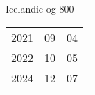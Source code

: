 \documentclass[10pt,a4paper]{article}
\begin{document}
	Icelandic og 800 ----

	\begin{tabular}{lll}
		2021 & 09 & 04\\
		2022 & 10 & 05\\
		2024 & 12 & 07
	\end{tabular}

	\vspace{1cm}

	
	
	
\end{document}
